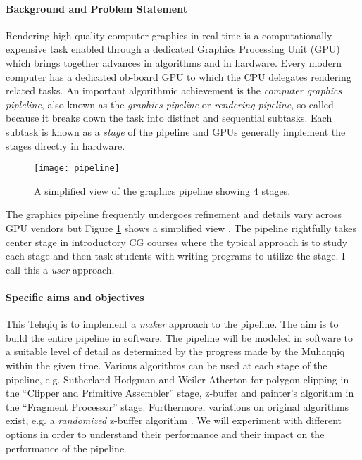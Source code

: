 \documentclass{article}
\begin{document}
\paragraph{Background and Problem Statement} Rendering high quality computer graphics in real time is a computationally expensive task enabled through a dedicated Graphics Processing Unit (GPU) which brings together advances in algorithms and in hardware. Every modern computer has a dedicated ob-board GPU to which the CPU delegates rendering related tasks. An important algorithmic achievement is the \textit{computer graphics pipleline}, also known as the \textit{graphics pipeline} or \textit{rendering pipeline}, so called because it breaks down the task into distinct and sequential subtasks. Each subtask is known as a \textit{stage} of the pipeline and GPUs generally implement the stages directly in hardware.\\
\begin{figure}[!h]
  \centering
  \texttt{[image: pipeline]}
  \caption{A simplified view of the graphics pipeline showing 4 stages.}
  \label{fig:pipeline}
\end{figure}

The graphics pipeline frequently undergoes refinement and details vary across GPU vendors but Figure \ref{fig:pipeline} shows a simplified view \cite{angel_2011}. The pipeline rightfully takes center stage in introductory CG courses where the typical approach is to study each stage and then task students with writing programs to utilize the stage. I call this a \textit{user} approach.

\paragraph{Specific aims and objectives}   This Tehqiq is to implement a \textit{maker} approach to the pipeline. The aim is to build the entire pipeline in software. The pipeline will be modeled in software to a suitable level of detail as determined by the progress made by the Muhaqqiq within the given time. Various algorithms can be used at each stage of the pipeline, e.g. Sutherland-Hodgman \cite{sutherland_hodgman} and Weiler-Atherton \cite{weiler_atherton} for polygon clipping in the ``Clipper and Primitive Assembler'' stage, z-buffer \cite{zbuffer} and painter's algorithm \cite{painter} in the ``Fragment Processor'' stage. Furthermore, variations on original algorithms exist, e.g. a \textit{randomized} z-buffer algorithm \cite{random_z}. We will experiment with different options in order to understand their performance and their impact on the performance of the pipeline.
\end{document}
